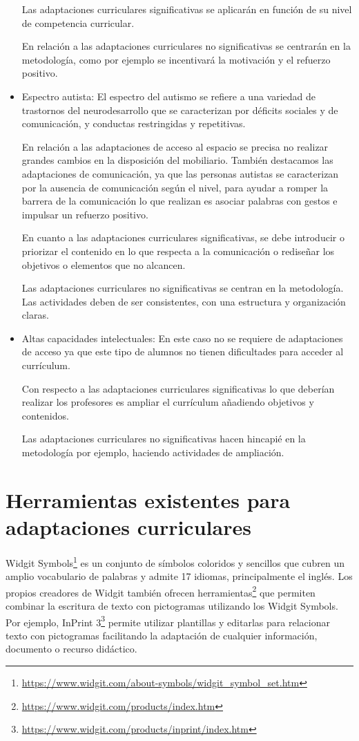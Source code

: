 \begin{itemize}
          Las adaptaciones curriculares significativas se aplicarán en función de su nivel de competencia curricular.

          En relación a las adaptaciones curriculares no significativas se centrarán en la metodología, como por ejemplo se incentivará la motivación y el refuerzo positivo.

    \item Espectro autista: El espectro del autismo se refiere a una variedad de trastornos del neurodesarrollo que se caracterizan por déficits sociales y de comunicación, y conductas restringidas y repetitivas.

          En relación a las adaptaciones de acceso al espacio se precisa no realizar grandes cambios en la disposición del mobiliario. También destacamos las adaptaciones de comunicación, ya que las personas autistas se caracterizan por la ausencia de comunicación según el nivel, para ayudar a romper la barrera de la comunicación lo que realizan es asociar palabras con gestos e impulsar un refuerzo positivo.

          En cuanto a las adaptaciones curriculares significativas, se debe introducir o priorizar el contenido en lo que respecta a la  comunicación o rediseñar los objetivos o elementos que no alcancen.

          Las adaptaciones curriculares no significativas se centran en la metodología. Las actividades deben de ser consistentes, con una estructura y organización claras.

    \item Altas capacidades intelectuales: En este caso no se requiere de adaptaciones de acceso ya que  este tipo de alumnos no tienen dificultades para acceder al currículum.

          Con respecto a las adaptaciones curriculares significativas lo que deberían realizar los profesores es ampliar el currículum añadiendo objetivos y contenidos.

          Las adaptaciones curriculares no significativas hacen hincapié en la metodología por ejemplo, haciendo actividades de ampliación.

\end{itemize}
\nocite{adaptacionUNED}


\section{Herramientas existentes para adaptaciones curriculares}
Widgit Symbols\footnote{\url{https://www.widgit.com/about-symbols/widgit_symbol_set.htm}} es un conjunto de símbolos coloridos y sencillos que cubren un amplio vocabulario de palabras y admite 17 idiomas, principalmente el inglés. Los propios creadores de Widgit también ofrecen herramientas\footnote{\url{https://www.widgit.com/products/index.htm}} que permiten combinar la escritura de texto con pictogramas utilizando los Widgit Symbols. Por ejemplo, InPrint 3\footnote{\url{https://www.widgit.com/products/inprint/index.htm}} permite utilizar plantillas y editarlas para relacionar texto con pictogramas facilitando la adaptación de cualquier información, documento o recurso didáctico.

